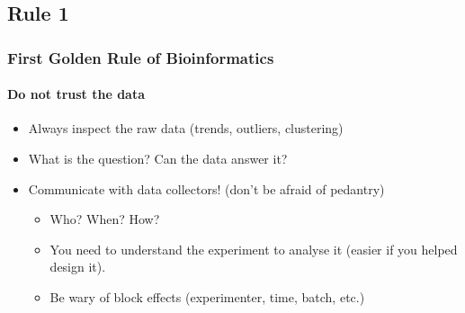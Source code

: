 %

\subsection{Rule 1}
\begin{frame}
  \frametitle{First Golden Rule of Bioinformatics}
  \framesubtitle{Do not trust the data}
  \begin{itemize}
    \item Always inspect the raw data (trends, outliers, clustering)
    \item What is the question? Can the data answer it?
    \item Communicate with data collectors! (don't be afraid of pedantry)
    \begin{itemize}
      \item Who? When? How?
      \item You need to understand the experiment to analyse it (easier if you helped design it).
      \item Be wary of block effects (experimenter, time, batch, etc.)
    \end{itemize}
  \end{itemize}
\end{frame}
